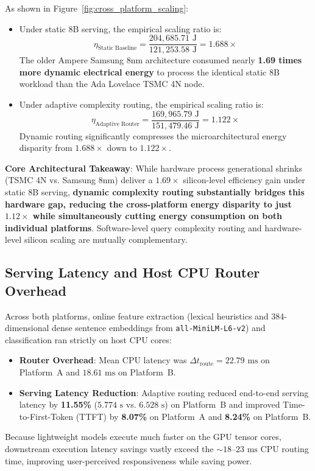 As shown in Figure~\ref{fig:cross_platform_scaling}:
\begin{itemize}
    \item Under static 8B serving, the empirical scaling ratio is:
    \begin{equation}
    \eta_{\text{Static Baseline}} = \frac{204,685.71\text{ J}}{121,253.58\text{ J}} = 1.688\times
    \end{equation}
    The older Ampere Samsung 8nm architecture consumed nearly \textbf{1.69 times more dynamic electrical energy} to process the identical static 8B workload than the Ada Lovelace TSMC 4N node.
    \item Under adaptive complexity routing, the empirical scaling ratio is:
    \begin{equation}
    \eta_{\text{Adaptive Router}} = \frac{169,965.79\text{ J}}{151,479.46\text{ J}} = 1.122\times
    \end{equation}
    Dynamic routing significantly compresses the microarchitectural energy disparity from $1.688\times$ down to $1.122\times$.
\end{itemize}

\textbf{Core Architectural Takeaway}: While hardware process generational shrinks (TSMC 4N vs. Samsung 8nm) deliver a $1.69\times$ silicon-level efficiency gain under static 8B serving, \textbf{dynamic complexity routing substantially bridges this hardware gap, reducing the cross-platform energy disparity to just $1.12\times$ while simultaneously cutting energy consumption on both individual platforms}. Software-level query complexity routing and hardware-level silicon scaling are mutually complementary.

\subsection{Serving Latency and Host CPU Router Overhead}
\label{subsec:latency_results}

Across both platforms, online feature extraction (lexical heuristics and 384-dimensional dense sentence embeddings from \texttt{all-MiniLM-L6-v2}) and classification ran strictly on host CPU cores:
\begin{itemize}
    \item \textbf{Router Overhead}: Mean CPU latency was $\Delta t_{\text{route}} = 22.79\text{ ms}$ on Platform~A and $18.61\text{ ms}$ on Platform~B.
    \item \textbf{Serving Latency Reduction}: Adaptive routing reduced end-to-end serving latency by \textbf{11.55\%} ($5.774\text{ s}$ vs. $6.528\text{ s}$) on Platform~B and improved Time-to-First-Token (TTFT) by \textbf{8.07\%} on Platform~A and \textbf{8.24\%} on Platform~B.
\end{itemize}
Because lightweight models execute much faster on the GPU tensor cores, downstream execution latency savings vastly exceed the $\sim 18\text{--}23\text{ ms}$ CPU routing time, improving user-perceived responsiveness while saving power.

